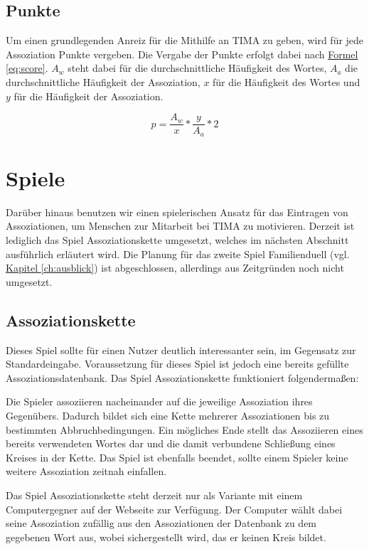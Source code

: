 \subsection{Punkte}\label{subsec:punkte}
Um einen grundlegenden Anreiz für die  Mithilfe an TIMA zu geben, wird für jede Assoziation Punkte vergeben. Die Vergabe der Punkte erfolgt dabei nach \hyperref[eq:score]{Formel \ref*{eq:score}}. $ A_w $ steht dabei für die durchschnittliche Häufigkeit des Wortes, $ A_a $ die durchschnittliche Häufigkeit der Assoziation, $ x $ für die Häufigkeit des Wortes und $ y $ für die Häufigkeit der Assoziation.

\begin{equation}\label{eq:score}
p = \frac{A_w}{x} * \frac{y}{A_a} * 2
\end{equation}

\section{Spiele}\label{sec:games}
Darüber hinaus benutzen wir einen spielerischen Ansatz für das Eintragen von Assoziationen, um Menschen zur Mitarbeit bei TIMA zu motivieren. Derzeit ist lediglich das Spiel Assoziationskette umgesetzt, welches im nächsten Abschnitt ausführlich erläutert wird. Die Planung für das zweite Spiel Familienduell (vgl. \hyperref[ch:ausblick]{Kapitel \ref*{ch:ausblick}}) ist abgeschlossen, allerdings aus Zeitgründen noch nicht umgesetzt.

\subsection{Assoziationskette}
Dieses Spiel sollte für einen Nutzer deutlich interessanter sein, im Gegensatz zur Standardeingabe. Voraussetzung für dieses Spiel ist jedoch eine bereits gefüllte
Assoziationsdatenbank. Das Spiel Assoziationskette funktioniert folgendermaßen:

Die Spieler assoziieren nacheinander auf die jeweilige Assoziation ihres
Gegenübers. Dadurch bildet sich eine Kette mehrerer Assoziationen bis
zu bestimmten Abbruchbedingungen. Ein mögliches Ende stellt das Assoziieren
eines bereits verwendeten Wortes dar und die damit verbundene Schließung eines
Kreises in der Kette. Das Spiel ist ebenfalls beendet, sollte einem Spieler
keine weitere Assoziation zeitnah einfallen.

Das Spiel Assoziationskette steht derzeit nur als Variante mit einem Computergegner auf der Webseite zur Verfügung. Der Computer wählt dabei seine Assoziation zufällig aus den Assoziationen der Datenbank zu dem gegebenen Wort aus, wobei sichergestellt wird, das er keinen Kreis bildet.

